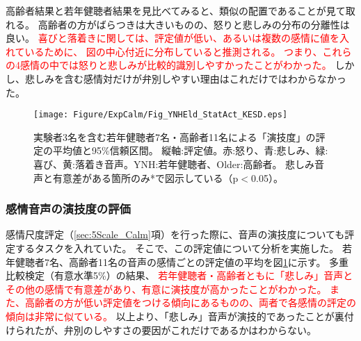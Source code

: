 高齢者結果と若年健聴者結果を見比べてみると、類似の配置であることが見て取れる。
高齢者の方がばらつきは大きいものの、怒りと悲しみの分布の分離性は良い。
\textcolor{red}{
  喜びと落着きに関しては、評定値が低い、あるいは複数の感情に値を入れているために、
  図の中心付近に分布していると推測される。
  つまり、これらの4感情の中では怒りと悲しみが比較的識別しやすかったことがわかった。
}
しかし、悲しみを含む感情対だけが弁別しやすい理由はこれだけではわからなかった。







\begin{figure}[h]
  \vspace{-10pt}
  \centerline{\texttt{[image: Figure/ExpCalm/Fig\_YNHEld\_StatAct\_KESD.eps]}}
  \vspace{0pt}
  \caption{実験者3名を含む若年健聴者7名・高齢者11名による「演技度」の評定の平均値と95\%信頼区間。
           縦軸:評定値。赤:怒り、青:悲しみ、緑:喜び、黄:落着き音声。YNH:若年健聴者、Older:高齢者。
           悲しみ音声と有意差がある箇所のみ*で図示している（p$<$0.05）。
          }
\vspace{-15pt}
\label{fig:StatAct}
\end{figure}

\subsubsection{感情音声の演技度の評価}
感情尺度評定（\ref{sec:5Scale_Calm}項）を行った際に、音声の演技度についても評定するタスクを入れていた。
そこで、この評定値について分析を実施した。
若年健聴者7名、高齢者11名の音声の感情ごとの評定値の平均を図\ref{fig:StatAct}に示す。 
多重比較検定（有意水準5\%）の結果、
\textcolor{red}{
  若年健聴者・高齢者ともに「悲しみ」音声とその他の感情で有意差があり、有意に演技度が高かったことがわかった。
  また、高齢者の方が低い評定値をつける傾向にあるものの、両者で各感情の評定の傾向は非常に似ている。
}
以上より、「悲しみ」音声が演技的であったことが裏付けられたが、弁別のしやすさの要因がこれだけであるかはわからない。



